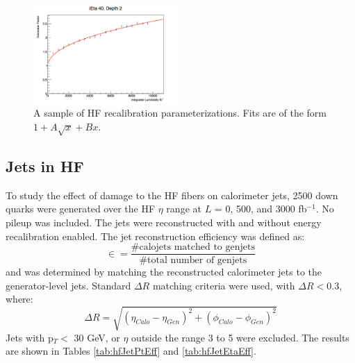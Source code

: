 \begin{figure}[hbtp]
\begin{center}
					\includegraphics[width=0.49\textwidth]{figures/Ch_4_raddam/HF_40D2.pdf}
					\caption[A sample of HF recalibration parameterizations.]{A sample of HF recalibration parameterizations.  Fits are of the form $1 + A\sqrt{x}+Bx$.}
					\label{fig:hfrecal}
				\end{center}
			\end{figure}
			
		\subsection{Jets in HF}
			To study the effect of damage to the HF fibers on calorimeter jets, 2500 down quarks were generated over the HF $\eta$ range at $L$ = 0, 500, and 3000 fb$^{-1}$.  No pileup was included. The jets were reconstructed with and without energy recalibration enabled.  The jet reconstruction efficiency was defined as:
			\begin{equation}
				\in = \frac{\# \text{calojets matched to genjets}}{\# \text{total number of genjets}}
			\end{equation}
			and was determined by matching the reconstructed calorimeter jets to the generator-level jets. Standard $\Delta R$ matching criteria were used, with $\Delta R < 0.3$, where:
			\begin{equation}
			\Delta R = \sqrt{(\eta_{Calo} - \eta_{Gen})^2+(\phi_{Calo} - \phi_{Gen})^2}
			\end{equation}
			Jets with p$_{T} <$ 30 GeV, or $\eta$ outside the range 3 to 5 were excluded.  The results are shown in Tables \ref{tab:hfJetPtEff} and \ref{tab:hfJetEtaEff}.
			
